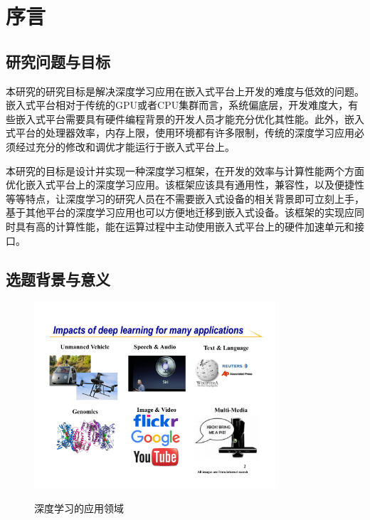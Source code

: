 
\chapter{序言}

\section{研究问题与目标}
本研究的研究目标是解决深度学习应用在嵌入式平台上开发的难度与低效的问题。嵌入式平台相对于传统的GPU或者CPU集群而言，系统偏底层，开发难度大，有些嵌入式平台需要具有硬件编程背景的开发人员才能充分优化其性能。此外，嵌入式平台的处理器效率，内存上限，使用环境都有许多限制，传统的深度学习应用必须经过充分的修改和调优才能运行于嵌入式平台上。

本研究的目标是设计并实现一种深度学习框架，在开发的效率与计算性能两个方面优化嵌入式平台上的深度学习应用。该框架应该具有通用性，兼容性，以及便捷性等等特点，让深度学习的研究人员在不需要嵌入式设备的相关背景即可立刻上手，基于其他平台的深度学习应用也可以方便地迁移到嵌入式设备。该框架的实现应同时具有高的计算性能，能在运算过程中主动使用嵌入式平台上的硬件加速单元和接口。

\section{选题背景与意义}

\begin{figure}[!ht]
	\centering
	\includegraphics[width=0.8\textwidth]{assets/imgs/deeplearning.pdf}
	\label{fig:deeplearning}
	\caption{深度学习的应用领域\protect\footnotemark}
\end{figure}

